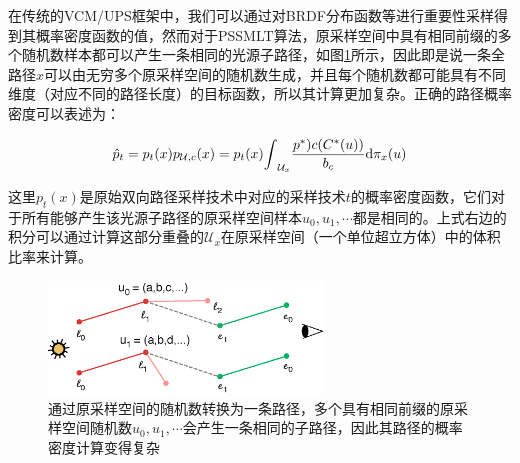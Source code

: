 在传统的VCM/UPS框架中，我们可以通过对BRDF分布函数等进行重要性采样得到其概率密度函数的值，然而对于PSSMLT算法，原采样空间中具有相同前缀的多个随机数样本都可以产生一条相同的光源子路径，如图\ref{f:mlt-mis-weight}所示，因此即是说一条全路径${x}$可以由无穷多个原采样空间的随机数生成，并且每个随机数都可能具有不同维度（对应不同的路径长度）的目标函数，所以其计算更加复杂。正确的路径概率密度可以表述为：

\begin{equation}
	\hat{p}_t=p_t({x})p_{\mathcal{U},c}({x})=p_t({x}){\rm \int}_{\mathcal{U}_x}\frac{p^{*})c(C^{*}(u))}{b_c}{\rm d}\pi_{{x}}(u)
\end{equation}

\noindent 这里$p_t({x})$是原始双向路径采样技术中对应的采样技术$t$的概率密度函数，它们对于所有能够产生该光源子路径的原采样空间样本$u_0,u_1,\cdots$都是相同的。上式右边的积分可以通过计算这部分重叠的$\mathcal{U}_{{x}}$在原采样空间（一个单位超立方体）中的体积比率来计算。

\begin{figure}
	\sidecaption
	\includegraphics[width=0.65\textwidth]{figures/mlt/mis-weight}
	\caption{通过原采样空间的随机数转换为一条路径，多个具有相同前缀的原采样空间随机数$u_0,u_1,\cdots$会产生一条相同的子路径，因此其路径的概率密度计算变得复杂}
	\label{f:mlt-mis-weight}
\end{figure}

